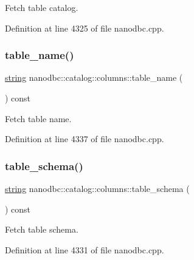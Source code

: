 Fetch table catalog. 



Definition at line 4325 of file nanodbc.\+cpp.

\mbox{\label{classnanodbc_1_1catalog_1_1columns_ab817aa0f9b4114a6d1ca7dc0449367ca}} 
\subsubsection{\texorpdfstring{table\_name()}{table\_name()}}
{\footnotesize\ttfamily \mbox{\hyperlink{namespacenanodbc_abfc0ece56278e590911ec8352774c212}{string}} nanodbc\+::catalog\+::columns\+::table\+\_\+name (\begin{DoxyParamCaption}{ }\end{DoxyParamCaption}) const}



Fetch table name. 



Definition at line 4337 of file nanodbc.\+cpp.

\mbox{\label{classnanodbc_1_1catalog_1_1columns_a5996e5ea342e758f14481776e75e74bd}} 
\subsubsection{\texorpdfstring{table\_schema()}{table\_schema()}}
{\footnotesize\ttfamily \mbox{\hyperlink{namespacenanodbc_abfc0ece56278e590911ec8352774c212}{string}} nanodbc\+::catalog\+::columns\+::table\+\_\+schema (\begin{DoxyParamCaption}{ }\end{DoxyParamCaption}) const}



Fetch table schema. 



Definition at line 4331 of file nanodbc.\+cpp.

\mbox{\label{classnanodbc_1_1catalog_1_1columns_a5e01f34b60ef7d038f11eb6d1d114683}} 
